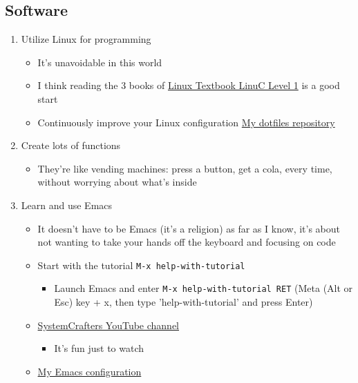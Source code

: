 \documentclass[a4paper,11pt]{article}
\begin{document}
\subsection{Software}
\begin{enumerate}
    \item Utilize Linux for programming
    \begin{itemize}
        \item It's unavoidable in this world
        \item I think reading the 3 books of \href{https://www.amazon.co.jp/s?k=linux+\%E3\%83\%AC\%E3\%83\%99\%E3\%83\%AB1&crid=RJR3JEEZ0J2T&sprefix=linux+\%2Caps\%2C287&ref=nb_sb_ss_ts-doa-p_7_6}{Linux Textbook LinuC Level 1} is a good start
        \item Continuously improve your Linux configuration \href{https://github.com/ywatanabe1989/.dotfiles-public}{My dotfiles repository}
    \end{itemize}
    \item Create lots of functions
    \begin{itemize}
        \item They're like vending machines: press a button, get a cola, every time, without worrying about what's inside
    \end{itemize}
    \item Learn and use Emacs
    \begin{itemize}
        \item It doesn't have to be Emacs (it's a religion) as far as I know, it's about not wanting to take your hands off the keyboard and focusing on code
        \item Start with the tutorial \texttt{M-x help-with-tutorial}
        \begin{itemize}
            \item Launch Emacs and enter \texttt{M-x help-with-tutorial RET} (Meta (Alt or Esc) key + x, then type 'help-with-tutorial' and press Enter)
        \end{itemize}
        \item \href{https://www.youtube.com/playlist?list=PLEoMzSkcN8oPH1au7H6B7bBJ4ZO7BXjSZ}{SystemCrafters YouTube channel}
        \begin{itemize}
            \item It's fun just to watch
        \end{itemize}
        \item \href{https://github.com/ywatanabe1989/.dotfiles-public/tree/main/.emacs.d/inits}{My Emacs configuration}

\end{itemize}
\end{enumerate}
\end{document}

